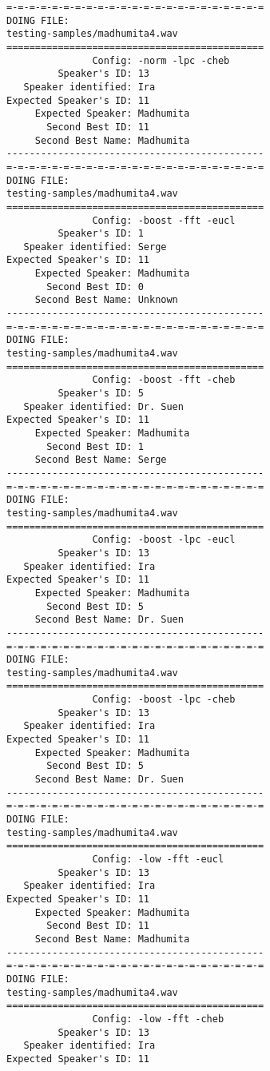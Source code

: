\begin{verbatim}
=-=-=-=-=-=-=-=-=-=-=-=-=-=-=-=-=-=-=-=-=-=-=
DOING FILE:
testing-samples/madhumita4.wav
=============================================
               Config: -norm -lpc -cheb
         Speaker's ID: 13
   Speaker identified: Ira
Expected Speaker's ID: 11
     Expected Speaker: Madhumita
       Second Best ID: 11
     Second Best Name: Madhumita
---------------------------------------------
=-=-=-=-=-=-=-=-=-=-=-=-=-=-=-=-=-=-=-=-=-=-=
DOING FILE:
testing-samples/madhumita4.wav
=============================================
               Config: -boost -fft -eucl
         Speaker's ID: 1
   Speaker identified: Serge
Expected Speaker's ID: 11
     Expected Speaker: Madhumita
       Second Best ID: 0
     Second Best Name: Unknown
---------------------------------------------
=-=-=-=-=-=-=-=-=-=-=-=-=-=-=-=-=-=-=-=-=-=-=
DOING FILE:
testing-samples/madhumita4.wav
=============================================
               Config: -boost -fft -cheb
         Speaker's ID: 5
   Speaker identified: Dr. Suen
Expected Speaker's ID: 11
     Expected Speaker: Madhumita
       Second Best ID: 1
     Second Best Name: Serge
---------------------------------------------
=-=-=-=-=-=-=-=-=-=-=-=-=-=-=-=-=-=-=-=-=-=-=
DOING FILE:
testing-samples/madhumita4.wav
=============================================
               Config: -boost -lpc -eucl
         Speaker's ID: 13
   Speaker identified: Ira
Expected Speaker's ID: 11
     Expected Speaker: Madhumita
       Second Best ID: 5
     Second Best Name: Dr. Suen
---------------------------------------------
=-=-=-=-=-=-=-=-=-=-=-=-=-=-=-=-=-=-=-=-=-=-=
DOING FILE:
testing-samples/madhumita4.wav
=============================================
               Config: -boost -lpc -cheb
         Speaker's ID: 13
   Speaker identified: Ira
Expected Speaker's ID: 11
     Expected Speaker: Madhumita
       Second Best ID: 5
     Second Best Name: Dr. Suen
---------------------------------------------
=-=-=-=-=-=-=-=-=-=-=-=-=-=-=-=-=-=-=-=-=-=-=
DOING FILE:
testing-samples/madhumita4.wav
=============================================
               Config: -low -fft -eucl
         Speaker's ID: 13
   Speaker identified: Ira
Expected Speaker's ID: 11
     Expected Speaker: Madhumita
       Second Best ID: 11
     Second Best Name: Madhumita
---------------------------------------------
=-=-=-=-=-=-=-=-=-=-=-=-=-=-=-=-=-=-=-=-=-=-=
DOING FILE:
testing-samples/madhumita4.wav
=============================================
               Config: -low -fft -cheb
         Speaker's ID: 13
   Speaker identified: Ira
Expected Speaker's ID: 11

\end{verbatim}

